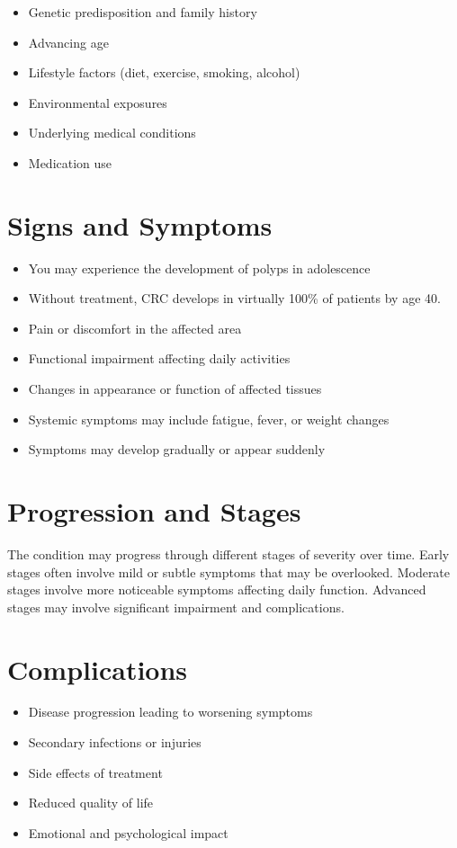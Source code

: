 \begin{itemize}[noitemsep]
  \item Genetic predisposition and family history
  \item Advancing age
  \item Lifestyle factors (diet, exercise, smoking, alcohol)
  \item Environmental exposures
  \item Underlying medical conditions
  \item Medication use
\end{itemize}
\section{Signs and Symptoms}
\begin{itemize}[noitemsep]
  \item You may experience the development of polyps in adolescence
  \item Without treatment, CRC develops in virtually 100\% of patients by age 40.
  \item Pain or discomfort in the affected area
  \item Functional impairment affecting daily activities
  \item Changes in appearance or function of affected tissues
  \item Systemic symptoms may include fatigue, fever, or weight changes
  \item Symptoms may develop gradually or appear suddenly
\end{itemize}
\section{Progression and Stages}
The condition may progress through different stages of severity over time. Early stages often involve mild or subtle symptoms that may be overlooked. Moderate stages involve more noticeable symptoms affecting daily function. Advanced stages may involve significant impairment and complications.
\section{Complications}
\begin{itemize}[noitemsep]
  \item Disease progression leading to worsening symptoms
  \item Secondary infections or injuries
  \item Side effects of treatment
  \item Reduced quality of life
  \item Emotional and psychological impact
\end{itemize}
